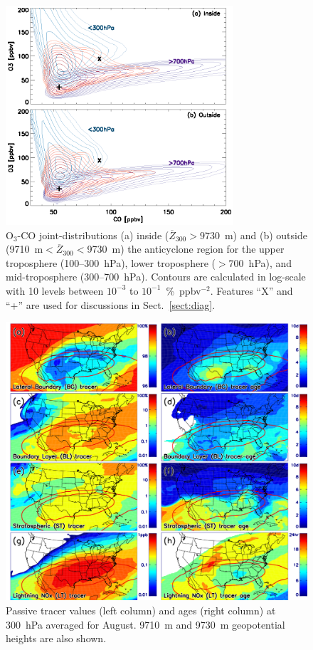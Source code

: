  \begin{figure}
	\noindent\includegraphics[width=20pc]{figures/o3co.eps} %
	\caption{O$_3$-CO joint-distributions (a) inside ($\overline{Z}_{300}>9730$~m)
	and (b) outside (9710~m$<\overline{Z}_{300}<$9730~m) the anticyclone region for
	the upper troposphere (100--300~hPa), lower troposphere ($>700$~hPa), and mid-troposphere (300--700~hPa).
	Contours are calculated in log-scale with 10 levels between $10^{-3}$ to $10^{-1}$~\%~ppbv$^{-2}$.
	Features ``X'' and ``+'' are used for discussions in Sect.~\ref{sect:diag}.}
 	\label{fig:o3co}
 \end{figure}

 \begin{figure}
 \noindent\includegraphics[width=40pc]{figures/tracer_maps.png}
 \caption{Passive tracer values (left column) and ages (right column) at 300~hPa averaged for August.
9710~m and 9730~m geopotential heights are also shown.}
 \label{fig:tracer}
 \end{figure}
